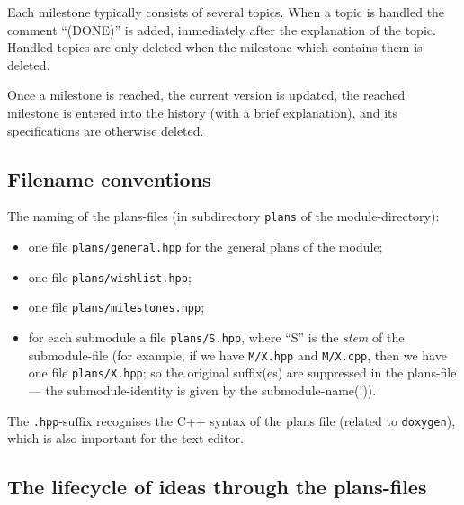\documentclass{book}
\newcommand{\filename}[1]{\texttt{#1}}
\newcommand{\name}[1]{\texttt{#1}}
\begin{document}
Each milestone typically consists of several topics. When a topic is handled the comment ``(DONE)'' is added, immediately after the explanation of the topic. Handled topics are only deleted when the milestone which contains them is deleted.

Once a milestone is reached, the current version is updated, the reached milestone is entered into the history (with a brief explanation), and its specifications are otherwise deleted.



\subsection{Filename conventions}
\label{sec:DoxygenPlans}

The naming of the plans-files (in subdirectory \texttt{plans} of the module-directory):
\begin{itemize}
\item one file \filename{plans/general.hpp} for the general plans of the module;
\item one file \filename{plans/wishlist.hpp};
\item one file \filename{plans/milestones.hpp};
\item for each submodule a file \filename{plans/S.hpp}, where ``S'' is the \emph{stem} of the submodule-file (for example, if we have \filename{M/X.hpp} and \filename{M/X.cpp}, then we have one file \filename{plans/X.hpp}; so the original suffix(es) are suppressed in the plans-file --- the submodule-identity is given by the submodule-name(!)).
\end{itemize}
The \filename{.hpp}-suffix recognises the C++ syntax of the plans file (related to \name{doxygen}), which is also important for the text editor.



\subsection{The lifecycle of ideas through the plans-files}
\label{sec:DoxygenPlansflow}
\end{document}
